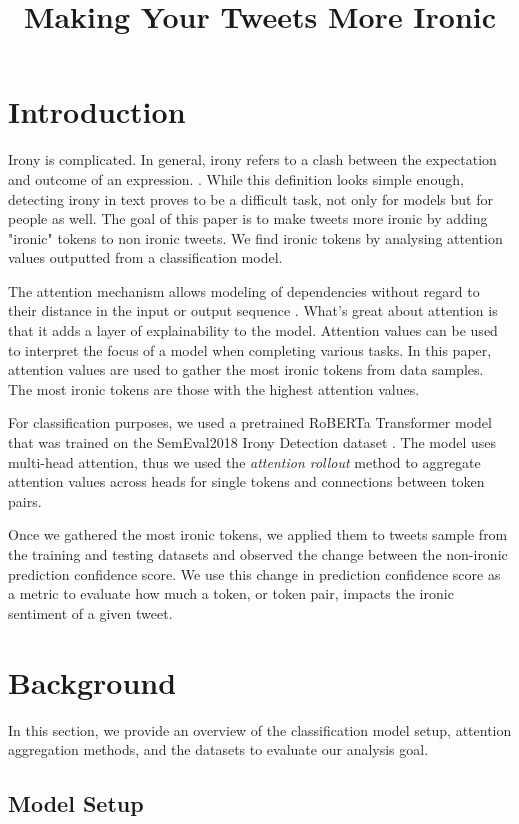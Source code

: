 \documentclass[10pt, a4paper]{article}
\title{Making Your Tweets More Ironic}
\begin{document}
\maketitleabstract

\section{Introduction}

Irony is complicated.
In general, irony refers to a clash between the expectation and outcome of an expression. \citep{kreutz-20}. 
While this definition looks simple enough, detecting irony in text proves to be a difficult task, not only for models but for people as well.
The goal of this paper is to make tweets more ironic by adding "ironic" tokens to non ironic tweets.
We find ironic tokens by analysing attention values outputted from a classification model.

The attention mechanism allows modeling of dependencies without regard to their distance in the input or output sequence \citep{all-you-need}.
What's great about attention is that it adds a layer of explainability to the model. Attention values can be used to interpret the focus of a model when completing various tasks.
In this paper, attention values are used to gather the most ironic tokens from data samples. The most ironic tokens are those with the highest attention values.

For classification purposes, we used a pretrained RoBERTa Transformer model that was trained on the SemEval2018 Irony Detection dataset \citep{roberta}.
The model uses multi-head attention, thus we used the \textit{attention rollout} method to aggregate attention values across heads for single tokens and connections between token pairs.

Once we gathered the most ironic tokens, we applied them to tweets sample from the training and testing datasets and observed the change between the non-ironic prediction confidence score.
We use this change in prediction confidence score as a metric to evaluate how much a token, or token pair, impacts the ironic sentiment of a given tweet.

\section{Background}

In this section, we provide an overview of the classification model setup, attention aggregation methods, and the datasets to evaluate our analysis goal.

\subsection{Model Setup}
\label{sec:first}
\end{document}
